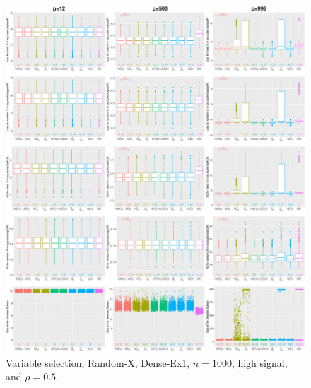 \begin{figure}[!ht]
\centering
\includegraphics[width=\textwidth]{figures/supplement/randomx/subset_selection/Dense-Ex1_n1000_hsnr_rho05.eps}
\caption{Variable selection, Random-X, Dense-Ex1, $n=1000$, high signal, and $\rho=0.5$.}
\end{figure}
\clearpage
